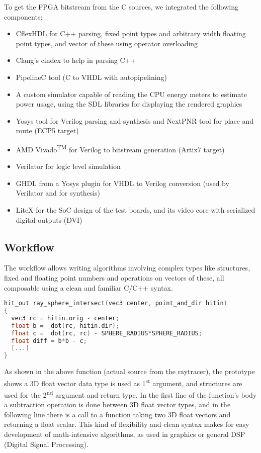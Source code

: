 \documentclass[conference]{IEEEtran}
\begin{document}
To get the FPGA bitstream from the C sources, we integrated the following components:

\begin{itemize}
\item CflexHDL\cite{cflexhdl} for C++ parsing, fixed point types and arbitrary width floating point types, and vector of these using operator overloading
\item Clang’s cindex\cite{cindex} to help in parsing C++
\item PipelineC\cite{pipelinec} tool (C to VHDL with autopipelining)
\item A custom simulator capable of reading the CPU energy meters to estimate power usage, using the SDL\cite{sdllib} libraries for displaying the rendered graphics
\item Yosys\cite{yosys} tool for Verilog parsing and synthesis and NextPNR\cite{nextpnr} tool for place and route (ECP5 target)
\item AMD Vivado\textsuperscript{TM} for Verilog to bitstream generation (Artix7 target)
\item Verilator for logic level simulation
\item GHDL\cite{GHDL} from a Yosys plugin\cite{ghdlplugin} for VHDL to Verilog conversion (used by Verilator and for synthesis)
\item LiteX\cite{litex} for the SoC design of the test boards, and its video core with serialized digital outputs (DVI)
\end{itemize}


\subsection{Workflow}

The workflow allows writing algorithms involving complex types like structures, fixed and floating point numbers and operations on vectors of these, all composable using a clean and familiar C/C++ syntax.

\begin{lstlisting}[language=C++]
hit_out ray_sphere_intersect(vec3 center, point_and_dir hitin)
{
  vec3 rc = hitin.orig - center;
  float b =  dot(rc, hitin.dir);
  float c =  dot(rc, rc) - SPHERE_RADIUS*SPHERE_RADIUS;
  float diff = b*b - c;
  [...]
}
\end{lstlisting}

As shown in the above function (actual source from the raytracer), the prototype shows a 3D float vector data type is used as 1\textsuperscript{st} argument, and structures are used for the 2\textsuperscript{nd} argument and return type. In the first line of the function's body a subtraction operation is done between 3D float vector types, and in the following line there is a call to a function taking two 3D float vectors and returning a float scalar. This kind of flexibility and clean syntax makes for easy development of math-intensive algorithms, as used in graphics or general DSP (Digital Signal Processing). 
\end{document}
